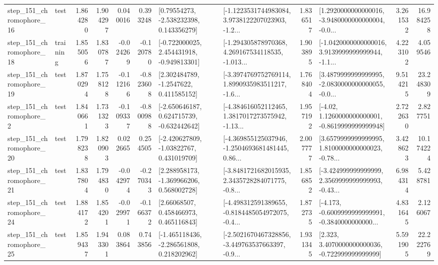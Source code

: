 \begin{tabular}{llrrrrllrlrr}
  step\_151\_chromophore\_16 &      test &      1.864280 &    1.904297 &      0.040016 &  0.393248 &     [0.79554273, -2.538232398, 0.143356279] &  [-1.1223531744983084, 3.9738122207023903, -1.2... &       1.836517 &  [1.2920000000000016, -3.9480000000000004, -0.0... &            3.261532 &         16.984258 \\
  step\_151\_chromophore\_18 &  training &      1.855056 &    1.830787 &     -0.024269 & -0.120780 &   [-0.722000025, 2.454431918, -0.949813301] &  [-1.294305878970368, 4.269167534118535, -1.013... &       1.903895 &  [-1.0420000000000016, 3.9139999999999944, -1.1... &            4.223102 &          4.059546 \\
  step\_151\_chromophore\_19 &      test &      1.870294 &    1.758128 &     -0.112166 & -0.823608 &      [2.302484789, -1.2547622, 0.411585152] &  [-3.3974769752769114, 1.8990935983511217, -1.6... &       1.768404 &  [3.4879999999999995, -2.0830000000000055, -0.0... &            9.514215 &         23.248309 \\
   step\_151\_chromophore\_2 &      test &      1.840661 &    1.731323 &     -0.109337 & -0.800988 &   [-2.650646187, 0.624715739, -0.632442642] &  [-4.384616052112465, 1.3817017273575942, -1.13... &       1.957192 &   [-4.02, 1.1260000000000001, -0.8619999999999948] &            2.722630 &          2.827751 \\
  step\_151\_chromophore\_20 &      test &      1.798238 &    1.820903 &      0.022665 &  0.254505 &    [-2.420627809, -1.03822767, 0.431019709] &  [-4.369855125037946, -1.2504693681481445, 0.86... &       2.007777 &  [3.6579999999999995, 1.8100000000000023, -0.78... &            3.428623 &         10.174224 \\
  step\_151\_chromophore\_21 &      test &      1.837804 &    1.794830 &     -0.042974 & -0.270343 &    [2.288958173, -1.369966206, 0.568002728] &  [-3.8481721682015935, 2.3435728284071775, -0.8... &       1.856852 &  [-3.424999999999999, 2.3569999999999993, -0.43... &            6.984314 &          5.428781 \\
  step\_151\_chromophore\_24 &      test &      1.884172 &    1.854201 &     -0.029971 & -0.166372 &      [2.66068507, 0.458466973, 0.465116843] &  [-4.498312591389655, -0.8184485054972075, -0.4... &       1.872735 &  [-4.173, -0.6009999999999991, -0.3840000000000... &            4.831645 &          2.126067 \\
  step\_151\_chromophore\_25 &      test &      1.859437 &    1.943301 &      0.083864 &  0.743856 &   [-1.465118436, -2.286561808, 0.218202962] &  [-2.5021670467328856, -3.449763537663397, -0.9... &       1.931345 &    [2.323, 3.4070000000000036, -0.722999999999999] &            5.591905 &         22.222769 \\

\end{tabular}
